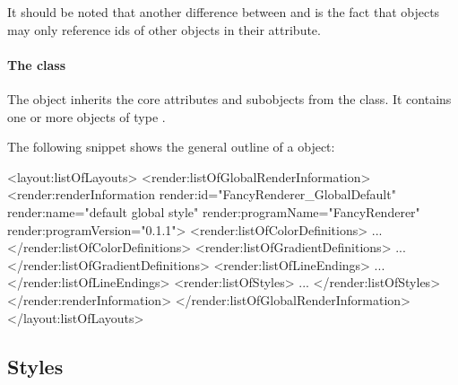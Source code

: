 It should be noted that another difference between \GlobalRenderInformation and \LocalRenderInformation is the 
fact that \GlobalRenderInformation objects may only reference ids of other 
\GlobalRenderInformation objects in their  attribute. 

\paragraph{The  class}
\label{listofglobalstyles-class}

The \ListOfGlobalStyles object inherits
the core attributes and subobjects from the  class. It
contains one or more objects of type \GlobalStyle.

\vspace{0.25cm}
The following snippet shows the general outline of a \ListOfGlobalRenderInformation object:


{\footnotesize
\begin{example}
<layout:listOfLayouts>
   <render:listOfGlobalRenderInformation>
      <render:renderInformation render:id="FancyRenderer_GlobalDefault" 
                         render:name="default global style" 
                         render:programName="FancyRenderer" 
                         render:programVersion="0.1.1">
        <render:listOfColorDefinitions>
             ...
        </render:listOfColorDefinitions>
        <render:listOfGradientDefinitions>
             ...
        </render:listOfGradientDefinitions>
        <render:listOfLineEndings>
             ...
        </render:listOfLineEndings>
        <render:listOfStyles>
             ...
        </render:listOfStyles>
      </render:renderInformation>
   </render:listOfGlobalRenderInformation>
</layout:listOfLayouts>
\end{example}
}
\subsection{Styles}


